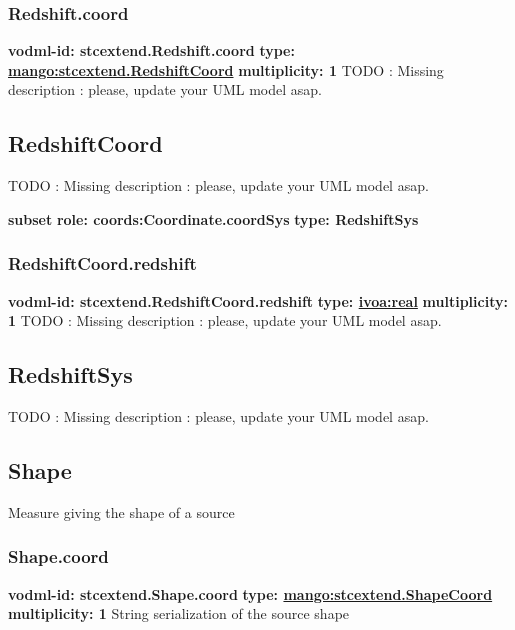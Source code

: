     \subsubsection{Redshift.coord}
      \textbf{vodml-id: stcextend.Redshift.coord} \newline
      \textbf{type: \hyperref[sect:stcextend.RedshiftCoord]{mango:stcextend.RedshiftCoord}} \newline
      \textbf{multiplicity: 1} \newline 
      TODO : Missing description : please, update your UML model asap.

  \subsection{RedshiftCoord}
  \label{sect:stcextend.RedshiftCoord}
    TODO : Missing description : please, update your UML model asap.

    \noindent \textbf{subset} \newline
    \indent   \textbf{role: coords:Coordinate.coordSys} \newline
    \indent   \textbf{type: RedshiftSys} \newline


    \subsubsection{RedshiftCoord.redshift}
      \textbf{vodml-id: stcextend.RedshiftCoord.redshift} \newline
      \textbf{type: \hyperref[sect:ivoa]{ivoa:real}} \newline
      \textbf{multiplicity: 1} \newline 
      TODO : Missing description : please, update your UML model asap.

  \subsection{RedshiftSys}
  \label{sect:stcextend.RedshiftSys}
    TODO : Missing description : please, update your UML model asap.

  \subsection{Shape}
  \label{sect:stcextend.Shape}
    Measure giving the shape of a source

    \subsubsection{Shape.coord}
      \textbf{vodml-id: stcextend.Shape.coord} \newline
      \textbf{type: \hyperref[sect:stcextend.ShapeCoord]{mango:stcextend.ShapeCoord}} \newline
      \textbf{multiplicity: 1} \newline 
      String serialization of the source shape

